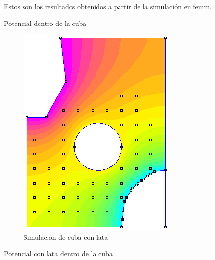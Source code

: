 \documentclass{article}
\begin{document}
Estos son los resultados obtenidos a partir de la simulación en femm.
        \begin{table}[H]
        \centering
        \begin{adjustbox}{max width=\columnwidth}
        	
        \end{adjustbox}
        \caption{Potencial dentro de la cuba}
        \end{table}
        
\begin{figure}[H]
\centering
\includegraphics[scale=1]{cubaConLata.png}
\caption{Simulación de cuba con lata}
\label{fig:3}
\end{figure}  
        
        \begin{table}[H]
        \begin{adjustbox}{max width=\columnwidth}

        \end{adjustbox}
        \caption{Potencial con lata dentro de la cuba}
        \end{table}      
\end{document}
